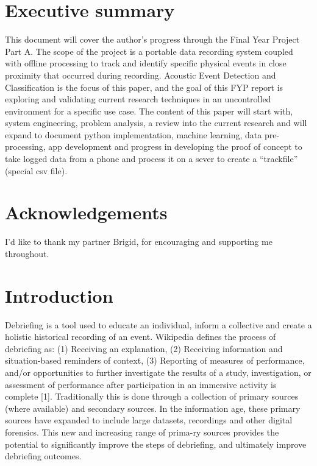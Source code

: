 \documentclass{UoNMCHA}
\numberwithin{equation}{section}
\begin{document}
\vspace{-5mm}
\section*{Executive summary}
\vspace{-3mm}
This document will cover the author's progress through the Final Year Project Part A. The scope of the project is a portable data recording system coupled with offline processing to track and identify specific physical events in close proximity that occurred during recording. Acoustic Event Detection and Classification is the focus of this paper, and the goal of this FYP report is exploring and validating current research techniques in an uncontrolled environment for a specific use case. The content of this paper will start with, system engineering, problem analysis, a review into the current research and will expand to document python implementation, machine learning, data pre-processing, app development and progress in developing the proof of concept to take logged data from a phone and process it on a sever to create a “trackfile” (special csv file).

\vspace{-2mm}
\section*{Acknowledgements}
\vspace{-3mm}
I'd like to thank my partner Brigid, for encouraging and supporting me throughout.
\newpage
\tableofcontents
\newpage
\section{Introduction}
Debriefing is a tool used to educate an individual, inform a collective and create a holistic historical recording of an event. Wikipedia defines the process of debriefing as: (1) Receiving an explanation, (2) Receiving information and situation-based reminders of context, (3) Reporting of measures of performance, and/or opportunities to further investigate the results of a study, investigation, or assessment of performance after participation in an immersive activity is complete [1]. Traditionally this is done through a collection of primary sources (where available) and secondary sources. In the information age, these primary sources have expanded to include large datasets, recordings and other digital forensics. This new and increasing range of prima-ry sources provides the potential to significantly improve the steps of debriefing, and ultimately improve debriefing outcomes.
\end{document}
